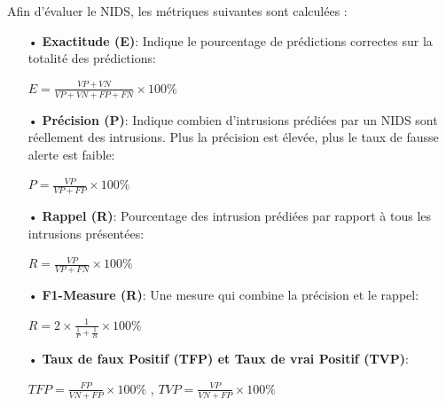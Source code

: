 Afin d'évaluer le NIDS, les métriques suivantes sont calculées :\\
\begin{itemize}
	\item[•] \textbf{Exactitude (E)}: Indique le pourcentage de prédictions correctes sur la totalité des prédictions:
	\begin{large}
		\begin{center}
			$ E = \frac{VP + VN}{ VP + VN + FP + FN} \times 100\% $
		\end{center}
	\end{large}
	
	\hfill
	
	\item[•] \textbf{Précision (P)}: Indique combien d’intrusions prédiées par un NIDS sont réellement des intrusions. Plus la précision est élevée, plus le taux de fausse alerte est faible:
	\begin{large}
		\begin{center}
			$ P = \frac{VP}{ VP + FP} \times 100\%$
		\end{center}
	\end{large}
	
	\hfill
	
	\item[•] \textbf{Rappel (R)}: Pourcentage des intrusion prédiées par rapport à tous les intrusions présentées:
	\begin{large}
		\begin{center}
			$ R = \frac{VP}{ VP + FN} \times 100\%$
		\end{center}
	\end{large}
	
	\hfill
	
	\item[•] \textbf{F1-Measure (R)}: Une mesure qui combine la précision et le rappel:\\
	\begin{large}
		\begin{center}
			$ R = 2 \times \frac{1}{ \frac{1}{P} + \frac{1}{R}} \times 100\%$
		\end{center}
	\end{large}
	
	\hfill
	
	\item[•] \textbf{Taux de faux Positif (TFP) et Taux de vrai Positif (TVP)}:\\
	\begin{large}
		\begin{center}
			$ TFP = \frac{FP}{ VN + FP} \times 100\%$ , $ TVP = \frac{VP}{ VN + FP} \times 100\%$ 
		\end{center}
	\end{large}
\end{itemize}

